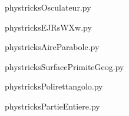     \newcommand{\CaptionFigOsculateur}{<+Type your caption here+>}
    \begin{center}
        
    \end{center}
    phystricksOsculateur.py

    

    \clearpage
    


    \newcommand{\CaptionFigEJRsWXw}{<+Type your caption here+>}
    \begin{center}
        
    \end{center}
    phystricksEJRsWXw.py

    

    \clearpage
    


    \newcommand{\CaptionFigAireParabole}{<+Type your caption here+>}
    \begin{center}
        
    \end{center}
    phystricksAireParabole.py

    

    \clearpage
    


    \newcommand{\CaptionFigSurfacePrimiteGeog}{<+Type your caption here+>}
    \begin{center}
        
    \end{center}
    phystricksSurfacePrimiteGeog.py

    

    \clearpage
    


    \newcommand{\CaptionFigPolirettangolo}{<+Type your caption here+>}
    \begin{center}
        
    \end{center}
    phystricksPolirettangolo.py

    

    \clearpage
    


    \newcommand{\CaptionFigPartieEntiere}{<+Type your caption here+>}
    \begin{center}
        
    \end{center}
    phystricksPartieEntiere.py

